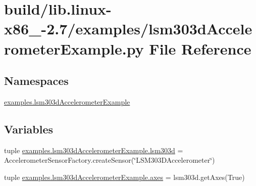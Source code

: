 \hypertarget{build_2lib_8linux-x86__64-2_87_2examples_2lsm303dAccelerometerExample_8py}{}\section{build/lib.linux-\/x86\+\_-\/2.7/examples/lsm303d\+Accelerometer\+Example.py File Reference}
\label{build_2lib_8linux-x86__64-2_87_2examples_2lsm303dAccelerometerExample_8py}
\subsection*{Namespaces}
\begin{DoxyCompactItemize}
\item 
 \hyperlink{namespaceexamples_1_1lsm303dAccelerometerExample}{examples.\+lsm303d\+Accelerometer\+Example}
\end{DoxyCompactItemize}
\subsection*{Variables}
\begin{DoxyCompactItemize}
\item 
tuple \hyperlink{namespaceexamples_1_1lsm303dAccelerometerExample_a417e4f0eb916b4176b0174046c76a1bf}{examples.\+lsm303d\+Accelerometer\+Example.\+lsm303d} = Accelerometer\+Sensor\+Factory.\+create\+Sensor(\char`\"{}L\+S\+M303\+D\+Accelerometer\char`\"{})
\item 
tuple \hyperlink{namespaceexamples_1_1lsm303dAccelerometerExample_aa5aef3fdd457232dc40bfaeac7bc708f}{examples.\+lsm303d\+Accelerometer\+Example.\+axes} = lsm303d.\+get\+Axes(True)
\end{DoxyCompactItemize}
